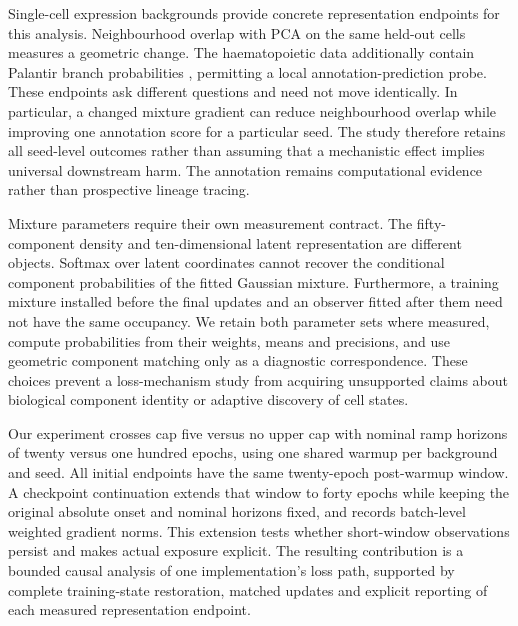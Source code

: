 \documentclass[11pt]{article}
\begin{document}
Single-cell expression backgrounds provide concrete representation endpoints for this analysis. Neighbourhood overlap with PCA on the same held-out cells measures a geometric change. The haematopoietic data additionally contain Palantir branch probabilities \cite{setty2019palantir}, permitting a local annotation-prediction probe. These endpoints ask different questions and need not move identically. In particular, a changed mixture gradient can reduce neighbourhood overlap while improving one annotation score for a particular seed. The study therefore retains all seed-level outcomes rather than assuming that a mechanistic effect implies universal downstream harm. The annotation remains computational evidence rather than prospective lineage tracing.

Mixture parameters require their own measurement contract. The fifty-component density and ten-dimensional latent representation are different objects. Softmax over latent coordinates cannot recover the conditional component probabilities of the fitted Gaussian mixture. Furthermore, a training mixture installed before the final updates and an observer fitted after them need not have the same occupancy. We retain both parameter sets where measured, compute probabilities from their weights, means and precisions, and use geometric component matching only as a diagnostic correspondence. These choices prevent a loss-mechanism study from acquiring unsupported claims about biological component identity or adaptive discovery of cell states.

Our experiment crosses cap five versus no upper cap with nominal ramp horizons of twenty versus one hundred epochs, using one shared warmup per background and seed. All initial endpoints have the same twenty-epoch post-warmup window. A checkpoint continuation extends that window to forty epochs while keeping the original absolute onset and nominal horizons fixed, and records batch-level weighted gradient norms. This extension tests whether short-window observations persist and makes actual exposure explicit. The resulting contribution is a bounded causal analysis of one implementation's loss path, supported by complete training-state restoration, matched updates and explicit reporting of each measured representation endpoint.
\end{document}

